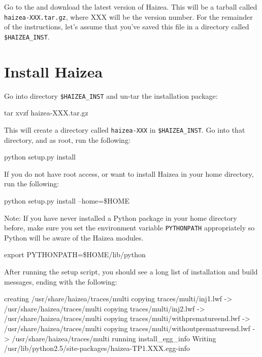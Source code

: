 Go to the  and download the latest version of Haizea. This will be a tarball called \texttt{haizea-XXX.tar.gz}, where XXX will be the version number. For the remainder of the instructions, let's assume that you've saved this file in a directory called \texttt{\$HAIZEA\_INST}.

\section{Install Haizea}

Go into directory \texttt{\$HAIZEA\_INST} and un-tar the installation package:

\begin{shellverbatim}
tar xvzf haizea-XXX.tar.gz
\end{shellverbatim}

This will create a directory called \texttt{haizea-XXX} in \texttt{\$HAIZEA\_INST}. Go into that directory, and as root, run the following:

\begin{shellverbatim}
python setup.py install
\end{shellverbatim}

If you do not have root access, or want to install Haizea in your home directory, run the following:

\begin{shellverbatim}
python setup.py install --home=\$HOME
\end{shellverbatim}

Note: If you have never installed a Python package in your home directory before, make sure you set the environment variable \texttt{PYTHONPATH} appropriately so Python will be aware of the Haizea modules.

\begin{shellverbatim}
export PYTHONPATH=\$HOME/lib/python
\end{shellverbatim}

After running the setup script, you should see a long list of installation and build messages, ending with the following:

\begin{wideshellverbatim}
creating /usr/share/haizea/traces/multi
copying traces/multi/inj1.lwf -> /usr/share/haizea/traces/multi
copying traces/multi/inj2.lwf -> /usr/share/haizea/traces/multi
copying traces/multi/withprematureend.lwf -> /usr/share/haizea/traces/multi
copying traces/multi/withoutprematureend.lwf -> /usr/share/haizea/traces/multi
running install_egg_info
Writing /usr/lib/python2.5/site-packages/haizea-TP1.XXX.egg-info
\end{wideshellverbatim}

